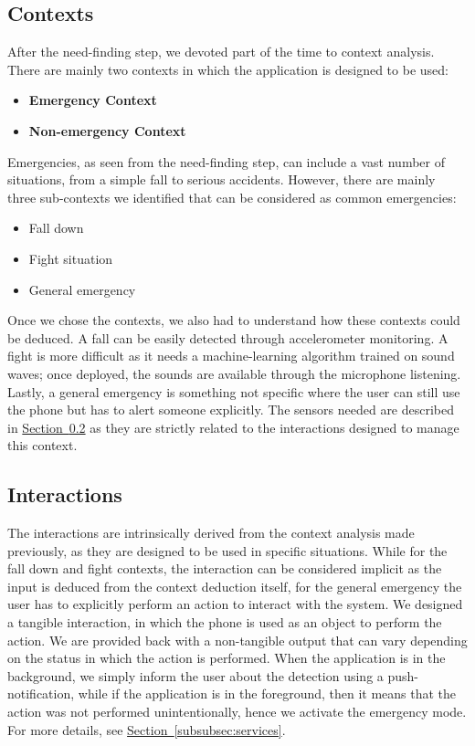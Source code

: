 \documentclass[12pt]{article}
\begin{document}
\subsection{Contexts}
After the need-finding step, we devoted part of the time to context analysis. There are mainly two contexts in which the application is designed to be used:
\begin{itemize}
    \item \textbf{Emergency Context}
    \item \textbf{Non-emergency Context}
\end{itemize}
Emergencies, as seen from the need-finding step, can include a vast number of situations, from a simple fall to serious accidents. However, there are mainly three sub-contexts we identified that can be considered as common emergencies:
\begin{itemize}
    \item Fall down
    \item Fight situation
    \item General emergency
\end{itemize}
Once we chose the contexts, we also had to understand how these contexts could be deduced. A fall can be easily detected through accelerometer monitoring. A fight is more difficult as it needs a machine-learning algorithm trained on sound waves; once deployed, the sounds are available through the microphone listening. Lastly, a general emergency is something not specific where the user can still use the phone but has to alert someone explicitly. The sensors needed are described in \hyperref[subsec:interactions]{Section~\ref*{subsec:interactions}} as they are strictly related to the interactions designed to manage this context.

\subsection{Interactions}
\label{subsec:interactions}
The interactions are intrinsically derived from the context analysis made previously, as they are designed to be used in specific situations. While for the fall down and fight contexts, the interaction can be considered implicit as the input is deduced from the context deduction itself, for the general emergency the user has to explicitly perform an action to interact with the system. We designed a tangible interaction, in which the phone is used as an object to perform the action. We are provided back with a non-tangible output that can vary depending on the status in which the action is performed. When the application is in the background, we simply inform the user about the detection using a push-notification, while if the application is in the foreground, then it means that the action was not performed unintentionally, hence we activate the emergency mode. For more details, see \hyperref[subsubsec:services]{Section~\ref*{subsubsec:services}}.
\end{document}
